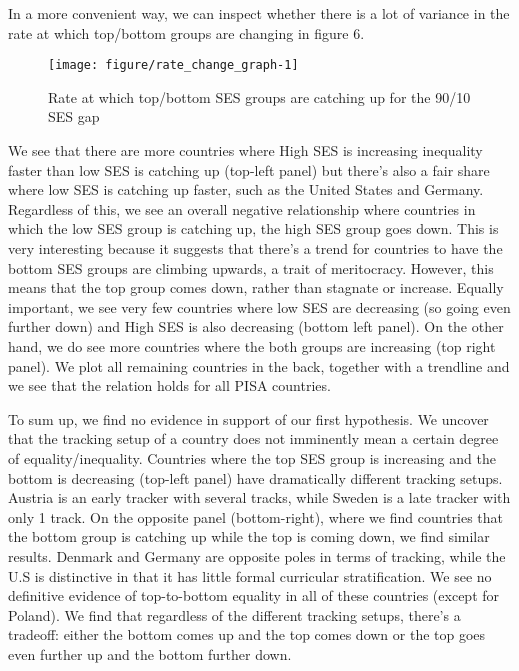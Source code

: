 \documentclass[11pt, a4paper]{article}\usepackage[]{graphicx}\usepackage[]{color}
\begin{document}
In a more convenient way, we can inspect whether there is a lot of variance in the rate at which top/bottom groups are changing in figure 6.



\begin{figure}

{\centering \texttt{[image: figure/rate\_change\_graph-1]} 

}

\caption[Rate at which top/bottom SES groups are catching up for the 90/10 SES gap]{Rate at which top/bottom SES groups are catching up for the 90/10 SES gap}\label{fig:rate_change_graph}
\end{figure}



We see that there are more countries where High SES is increasing inequality faster than low SES is catching up (top-left panel) but there's also a fair share where low SES is catching up faster, such as the United States and Germany. Regardless of this, we see an overall negative relationship where countries in which the low SES group is catching up, the high SES group goes down. This is very interesting because it suggests that there's a trend for countries to have the bottom SES groups are climbing upwards, a trait of meritocracy. However, this means that the top group comes down, rather than stagnate or increase. Equally important, we see very few countries where low SES are decreasing (so going even further down) and High SES is also decreasing (bottom left panel). On the other hand, we do see more countries where the both groups are increasing (top right panel). We plot all remaining countries in the back, together with a trendline and we see that the relation holds for all PISA countries.

To sum up, we find no evidence in support of our first hypothesis. We uncover that the tracking setup of a country does not imminently mean a certain degree of equality/inequality. Countries where the top SES group is increasing and the bottom is decreasing (top-left panel) have dramatically different tracking setups. Austria is an early tracker with several tracks, while Sweden is a late tracker with only 1 track. On the opposite panel (bottom-right), where we find countries that the bottom group is catching up while the top is coming down, we find similar results. Denmark and Germany are opposite poles in terms of tracking, while the U.S is distinctive in that it has little formal curricular stratification. We see no definitive evidence of top-to-bottom equality in all of these countries (except for Poland). We find that regardless of the different tracking setups, there's a tradeoff: either the bottom comes up and the top comes down or the top goes even further up and the bottom further down.
\end{document}
